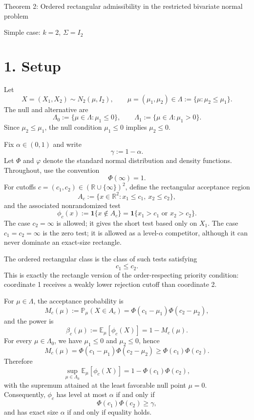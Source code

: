 \documentclass[12pt]{article}
\theoremstyle{definition}
\theoremstyle{remark}
\newcommand{\R}{\mathbb R}
\newcommand{\E}{\mathbb E}
\newcommand{\Prob}{\mathbb P}
\newcommand{\one}{\mathbf 1}
\newcommand{\phidens}{\varphi}
\newcommand{\phitest}{\phi}
\newcommand{\gammalev}{\gamma}
\begin{document}
\begin{center}
{\Large Theorem 2: Ordered rectangular admissibility in the restricted bivariate normal problem}

\vspace{0.5em}
{\large Simple case: $k=2$, $\Sigma=I_2$}
\end{center}

\section*{1. Setup}

Let
\[
X=(X_1,X_2)\sim N_2(\mu,I_2),
\qquad
\mu=(\mu_1,\mu_2)\in\Lambda:=\{\mu:\mu_2\le \mu_1\}.
\]
The null and alternative are
\[
\Lambda_0:=\{\mu\in\Lambda:\mu_1\le 0\},
\qquad
\Lambda_1:=\{\mu\in\Lambda:\mu_1>0\}.
\]
Since $\mu_2\le \mu_1$, the null condition $\mu_1\le0$ implies $\mu_2\le0$.

Fix $\alpha\in(0,1)$ and write
\[
\gammalev:=1-\alpha.
\]
Let $\Phi$ and $\phidens$ denote the standard normal distribution and density functions.  Throughout, use the convention
\[
\Phi(\infty)=1.
\]
For cutoffs $c=(c_1,c_2)\in(\R\cup\{\infty\})^2$, define the rectangular acceptance region
\[
A_c:=\{x\in\R^2:x_1\le c_1,\ x_2\le c_2\},
\]
and the associated nonrandomized test
\[
\phitest_c(x):=\one\{x\notin A_c\}
=\one\{x_1>c_1\text{ or }x_2>c_2\}.
\]
The case $c_2=\infty$ is allowed; it gives the short test based only on $X_1$.  The case $c_1=c_2=\infty$ is the zero test; it is allowed as a level-$\alpha$ competitor, although it can never dominate an exact-size rectangle.

The ordered rectangular class is the class of such tests satisfying
\[
c_1\le c_2.
\]
This is exactly the rectangle version of the order-respecting priority condition: coordinate 1 receives a weakly lower rejection cutoff than coordinate 2.

For $\mu\in\Lambda$, the acceptance probability is
\begin{equation}\label{eq:miss-probability}
M_c(\mu):=
\Prob_\mu(X\in A_c)
=
\Phi(c_1-\mu_1)\Phi(c_2-\mu_2),
\end{equation}
and the power is
\[
\beta_c(\mu):=
\E_\mu[\phitest_c(X)]
=1-M_c(\mu).
\]
For every $\mu\in\Lambda_0$, we have $\mu_1\le0$ and $\mu_2\le0$, hence
\[
M_c(\mu)
=\Phi(c_1-\mu_1)\Phi(c_2-\mu_2)
\ge
\Phi(c_1)\Phi(c_2).
\]
Therefore
\[
\sup_{\mu\in\Lambda_0}\E_\mu[\phitest_c(X)]
=1-\Phi(c_1)\Phi(c_2),
\]
with the supremum attained at the least favorable null point $\mu=0$.
Consequently, $\phitest_c$ has level at most $\alpha$ if and only if
\begin{equation}\label{eq:level-constraint}
\Phi(c_1)\Phi(c_2)\ge \gammalev,
\end{equation}
and has exact size $\alpha$ if and only if equality holds.
\end{document}
